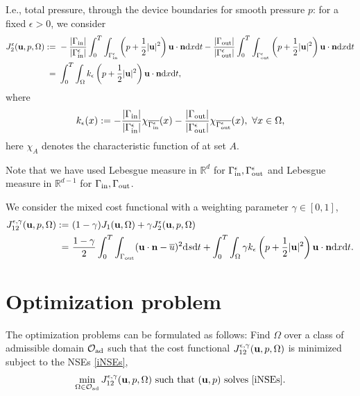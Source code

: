 \documentclass[oneside,11pt]{book}
\numberwithin{equation}{section}
\begin{document}
I.e., total pressure, through the device boundaries for smooth pressure $p$: for a fixed $\epsilon > 0$, we consider
\begin{align}
    J_2^\epsilon({\bf u},p,\Omega) :=&\ -\frac{|\Gamma_{\rm in}|}{|\Gamma_{\rm in}^\epsilon|}\int_0^T\int_{\Gamma_{\rm in}^\epsilon} \left(p + \frac{1}{2}|{\bf u}|^2\right){\bf u}\cdot{\bf n}{\rm d}x{\rm d}t - \frac{|\Gamma_{\rm out}|}{|\Gamma_{\rm out}^\epsilon|}\int_0^T\int_{\Gamma_{\rm out}^\epsilon} \left(p + \frac{1}{2}|{\bf u}|^2\right){\bf u}\cdot{\bf n}{\rm d}x{\rm d}t\\
    =&\ \int_0^T\int_\Omega k_\epsilon\left(p + \frac{1}{2}|{\bf u}|^2\right){\bf u}\cdot{\bf n}{\rm d}x{\rm d}t,
\end{align}
where
\begin{align}
    k_\epsilon(x):= -\frac{|\Gamma_{\rm in}|}{|\Gamma_{\rm in}^\epsilon|}\chi_{\overline{\Gamma_{\rm in}^\epsilon}}(x) - \frac{|\Gamma_{\rm out}|}{|\Gamma_{\rm out}^\epsilon|}\chi_{\overline{\Gamma_{\rm out}^\epsilon}}(x),\ \forall x\in\Omega,
\end{align}
here $\chi_A$ denotes the characteristic function of at set $A$.

Note that we have used Lebesgue measure in $\mathbb{R}^d$ for $\Gamma_{\rm in}^\epsilon,\Gamma_{\rm out}^\epsilon$ and Lebesgue measure in $\mathbb{R}^{d-1}$ for $\Gamma_{\rm in},\Gamma_{\rm out}$.

We consider the mixed cost functional with a weighting parameter $\gamma\in[0,1]$,
\begin{align}
    J_{12}^{\epsilon,\gamma}({\bf u},p,\Omega) :=&\ (1 - \gamma)J_1({\bf u},\Omega) + \gamma J_2^\epsilon({\bf u},p,\Omega)\\
    =&\ \frac{1 - \gamma}{2}\int_0^T\int_{\Gamma_{\rm out}} ({\bf u}\cdot{\bf n} - \overline{u})^2{\rm d}s{\rm d}t + \int_0^T\int_\Omega \gamma k_\epsilon\left(p + \frac{1}{2}|{\bf u}|^2\right){\bf u}\cdot{\bf n}{\rm d}x{\rm d}t.
\end{align}

\section{Optimization problem}
The optimization problems can be formulated as follows: Find $\Omega$ over a class of admissible domain $\mathcal{O}_{\rm ad}$ such that the cost functional $J_{12}^{\epsilon,\gamma}({\bf u},p,\Omega)$ is minimized subject to the NSEs \eqref{iNSEs},
\begin{align}
    \label{SOP}
    \min_{\Omega\in\mathcal{O}_{\rm ad}} J_{12}^{\epsilon,\gamma}({\bf u},p,\Omega) \mbox{ such that } ({\bf u},p) \mbox{ solves \eqref{iNSEs}}.
\end{align}
\end{document}
